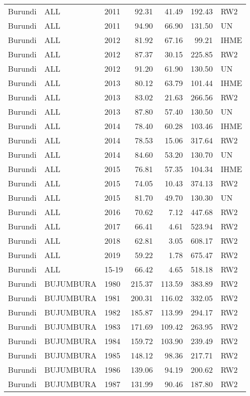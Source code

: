 \begin{longtable}{lllrrrl}
  Burundi & ALL & 2011 & 92.31 & 41.49 & 192.43 & RW2 \\ 
  Burundi & ALL & 2011 & 94.90 & 66.90 & 131.50 & UN \\ 
  Burundi & ALL & 2012 & 81.92 & 67.16 & 99.21 & IHME \\ 
  Burundi & ALL & 2012 & 87.37 & 30.15 & 225.85 & RW2 \\ 
  Burundi & ALL & 2012 & 91.20 & 61.90 & 130.50 & UN \\ 
  Burundi & ALL & 2013 & 80.12 & 63.79 & 101.44 & IHME \\ 
  Burundi & ALL & 2013 & 83.02 & 21.63 & 266.56 & RW2 \\ 
  Burundi & ALL & 2013 & 87.80 & 57.40 & 130.50 & UN \\ 
  Burundi & ALL & 2014 & 78.40 & 60.28 & 103.46 & IHME \\ 
  Burundi & ALL & 2014 & 78.53 & 15.06 & 317.64 & RW2 \\ 
  Burundi & ALL & 2014 & 84.60 & 53.20 & 130.70 & UN \\ 
  Burundi & ALL & 2015 & 76.81 & 57.35 & 104.34 & IHME \\ 
  Burundi & ALL & 2015 & 74.05 & 10.43 & 374.13 & RW2 \\ 
  Burundi & ALL & 2015 & 81.70 & 49.70 & 130.30 & UN \\ 
  Burundi & ALL & 2016 & 70.62 & 7.12 & 447.68 & RW2 \\ 
  Burundi & ALL & 2017 & 66.41 & 4.61 & 523.94 & RW2 \\ 
  Burundi & ALL & 2018 & 62.81 & 3.05 & 608.17 & RW2 \\ 
  Burundi & ALL & 2019 & 59.22 & 1.78 & 675.47 & RW2 \\ 
  Burundi & ALL & 15-19 & 66.42 & 4.65 & 518.18 & RW2 \\ 
  Burundi & BUJUMBURA & 1980 & 215.37 & 113.59 & 383.89 & RW2 \\ 
  Burundi & BUJUMBURA & 1981 & 200.31 & 116.02 & 332.05 & RW2 \\ 
  Burundi & BUJUMBURA & 1982 & 185.87 & 113.99 & 294.17 & RW2 \\ 
  Burundi & BUJUMBURA & 1983 & 171.69 & 109.42 & 263.95 & RW2 \\ 
  Burundi & BUJUMBURA & 1984 & 159.72 & 103.90 & 239.49 & RW2 \\ 
  Burundi & BUJUMBURA & 1985 & 148.12 & 98.36 & 217.71 & RW2 \\ 
  Burundi & BUJUMBURA & 1986 & 139.06 & 94.19 & 200.62 & RW2 \\ 
  Burundi & BUJUMBURA & 1987 & 131.99 & 90.46 & 187.80 & RW2 \\ 

\end{longtable}
